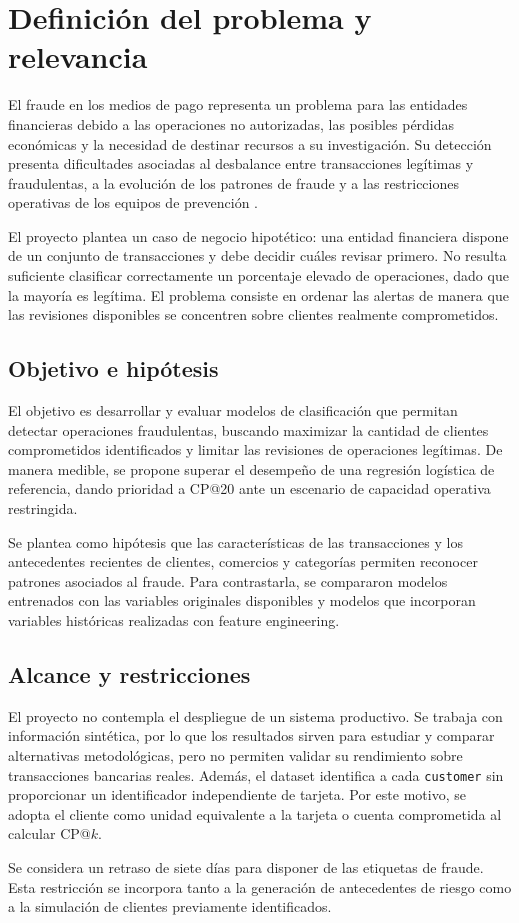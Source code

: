 \section{Definición del problema y relevancia}

El fraude en los medios de pago representa un problema para las entidades financieras debido a las operaciones no autorizadas, las posibles pérdidas económicas y la necesidad de destinar recursos a su investigación. Su detección presenta dificultades asociadas al desbalance entre transacciones legítimas y fraudulentas, a la evolución de los patrones de fraude y a las restricciones operativas de los equipos de prevención \cite{leborgne2022fraud}.

El proyecto plantea un caso de negocio hipotético: una entidad financiera dispone de un conjunto de transacciones y debe decidir cuáles revisar primero. No resulta suficiente clasificar correctamente un porcentaje elevado de operaciones, dado que la mayoría es legítima. El problema consiste en ordenar las alertas de manera que las revisiones disponibles se concentren sobre clientes realmente comprometidos.

\subsection{Objetivo e hipótesis}
El objetivo es desarrollar y evaluar modelos de clasificación que permitan detectar operaciones fraudulentas, buscando maximizar la cantidad de clientes comprometidos identificados y limitar las revisiones de operaciones legítimas. De manera medible, se propone superar el desempeño de una regresión logística de referencia, dando prioridad a CP@20 ante un escenario de capacidad operativa restringida.

Se plantea como hipótesis que las características de las transacciones y los antecedentes recientes de clientes, comercios y categorías permiten reconocer patrones asociados al fraude. Para contrastarla, se compararon modelos entrenados con las variables originales disponibles y modelos que incorporan variables históricas realizadas con feature engineering.

\subsection{Alcance y restricciones}
El proyecto no contempla el despliegue de un sistema productivo. Se trabaja con información sintética, por lo que los resultados sirven para estudiar y comparar alternativas metodológicas, pero no permiten validar su rendimiento sobre transacciones bancarias reales. Además, el dataset identifica a cada \texttt{customer} sin proporcionar un identificador independiente de tarjeta. Por este motivo, se adopta el cliente como unidad equivalente a la tarjeta o cuenta comprometida al calcular CP@$k$.

Se considera un retraso de siete días para disponer de las etiquetas de fraude. Esta restricción se incorpora tanto a la generación de antecedentes de riesgo como a la simulación de clientes previamente identificados.